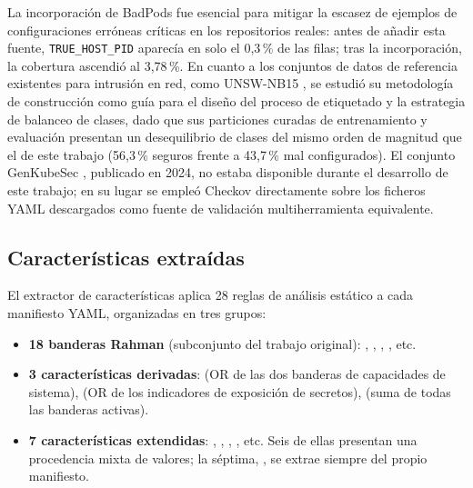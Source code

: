 La incorporación de BadPods fue esencial para mitigar la escasez de ejemplos de
configuraciones erróneas críticas en los repositorios reales: antes de añadir esta fuente,
\texttt{TRUE\_HOST\_PID} aparecía en solo el 0,3\,\% de las filas; tras la incorporación,
la cobertura ascendió al 3,78\,\%. En cuanto a los conjuntos de datos de referencia
existentes para intrusión en red, como UNSW-NB15 \citep{Moustafa2015}, se estudió su
metodología de construcción como guía para el diseño del proceso de etiquetado y la
estrategia de balanceo de clases, dado que sus particiones curadas de entrenamiento y
evaluación presentan un desequilibrio de clases del mismo orden de magnitud que el de
este trabajo (56,3\,\% seguros frente a 43,7\,\% mal configurados). El conjunto GenKubeSec
\citep{Malul2024}, publicado en 2024, no estaba disponible durante el desarrollo de
este trabajo; en su lugar se empleó Checkov \citep{Checkov2021} directamente
sobre los ficheros \acs{YAML} descargados como fuente de validación multiherramienta
equivalente.

\subsection{Características extraídas}

El extractor de características aplica 28 reglas de análisis estático a cada manifiesto
\acs{YAML}, organizadas en tres grupos:

\begin{itemize}
  \item \textbf{18 banderas Rahman} (subconjunto del trabajo original): ,
    , , ,
    etc.
  \item \textbf{3 características derivadas}:  (OR de las dos banderas de
    capacidades de sistema),  (OR de los indicadores de exposición
    de secretos),  (suma de todas las banderas activas).
  \item \textbf{7 características extendidas}: ,
    , , ,
    etc. Seis de ellas presentan una procedencia mixta de valores; la séptima,
    , se extrae siempre del propio manifiesto.
\end{itemize}

